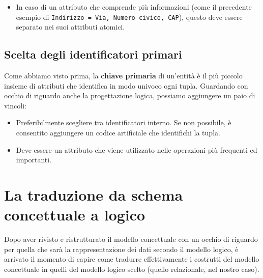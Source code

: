 \documentclass[12pt]{report}
\begin{document}
\begin{enumerate}
\begin{itemize}
\begin{center}
{%
				}
			\end{center}
			
			\item In caso di un attributo che comprende più informazioni (come il precedente esempio di \texttt{Indirizzo = Via, Numero civico, CAP}), questo deve essere separato nei suoi attributi atomici.
			
		\end{itemize}
		
	\end{enumerate}
	
	\subsection{Scelta degli identificatori primari}
	Come abbiamo visto prima, la \textbf{chiave primaria} di un'entità è il più piccolo insieme di attributi che identifica in modo univoco ogni tupla. Guardando con occhio di riguardo anche la progettazione logica, possiamo aggiungere un paio di vincoli:
	\begin{itemize}
		\item Preferibilmente scegliere tra identificatori interno. Se non possibile, è consentito aggiungere un codice artificiale che identifichi la tupla.
		
		\item Deve essere un attributo che viene utilizzato nelle operazioni più frequenti ed importanti.
	\end{itemize}
	
	\section{La traduzione da schema concettuale a logico}
	Dopo aver rivisto e ristrutturato il modello concettuale con un occhio di riguardo per quella che sarà la rappresentazione dei dati secondo il modello logico, è arrivato il momento di capire come tradurre effettivamente i costrutti del modello concettuale in quelli del modello logico scelto (quello relazionale, nel nostro caso).
	
\end{document}
